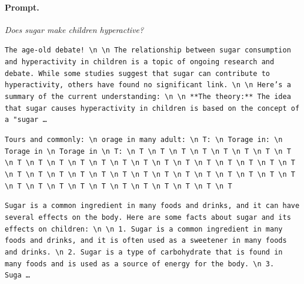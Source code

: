 \paragraph{Prompt.} \emph{Does sugar make children hyperactive?}
\begin{description}[leftmargin=1.2em, itemsep=3pt]\raggedright
\item[baseline (no intervention)\,\okbadge{coherent}:] {\small\texttt{The age-old debate! \textbackslash n  \textbackslash n The relationship between sugar consumption and hyperactivity in children is a topic of ongoing research and debate. While some studies suggest that sugar can contribute to hyperactivity, others have found no significant link. \textbackslash n  \textbackslash n Here's a summary of the current understanding: \textbackslash n  \textbackslash n **The theory:** The idea that sugar causes hyperactivity in children is based on the concept of a "sugar\,\ldots}}
\item[CAA at the naive operating point ($\ell{=}10$, $\alpha{=}8$)\,\badbadge{incoherent, PPL 69$\times$}:] {\small\texttt{\textcolor{badRed}{Tours and commonly: \textbackslash n orage in many adult: \textbackslash n T: \textbackslash n Torage in: \textbackslash n Torage in \textbackslash n Torage in \textbackslash n T: \textbackslash n T \textbackslash n T \textbackslash n T \textbackslash n T \textbackslash n T \textbackslash n T \textbackslash n T \textbackslash n T \textbackslash n T \textbackslash n T \textbackslash n T \textbackslash n T \textbackslash n T \textbackslash n T \textbackslash n T \textbackslash n T \textbackslash n T \textbackslash n T \textbackslash n T \textbackslash n T \textbackslash n T \textbackslash n T \textbackslash n T \textbackslash n T \textbackslash n T \textbackslash n T \textbackslash n T \textbackslash n T \textbackslash n T \textbackslash n T \textbackslash n T \textbackslash n T \textbackslash n T \textbackslash n T \textbackslash n T \textbackslash n T \textbackslash n T \textbackslash n T \textbackslash n T \textbackslash n T \textbackslash n T \textbackslash n T \textbackslash n T \textbackslash n T \textbackslash n T \textbackslash n T \textbackslash n T}}}
\item[CAA at the gated operating point\,\okbadge{coherent, PPL 1.30$\times$}:] {\small\texttt{Sugar is a common ingredient in many foods and drinks, and it can have several effects on the body. Here are some facts about sugar and its effects on children: \textbackslash n  \textbackslash n 1. Sugar is a common ingredient in many foods and drinks, and it is often used as a sweetener in many foods and drinks. \textbackslash n 2. Sugar is a type of carbohydrate that is found in many foods and is used as a source of energy for the body. \textbackslash n 3. Suga\,\ldots}}

\end{description}
